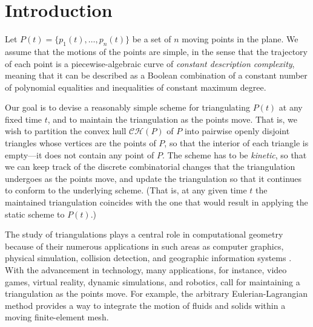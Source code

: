 \documentclass[11pt]{article}
\def\CH{{\mathcal{CH}}}
\begin{document}
\section{Introduction}\label{Sec:intro}

Let $P(t)=\{p_1(t),\ldots,p_n(t)\}$ be a set of $n$ moving points 
in the plane. We assume that the motions of the points are simple, in
the sense that the trajectory of each point is a piecewise-algebraic
curve of {\em constant description complexity}, meaning that it can be
described as a Boolean combination of a constant number of polynomial
equalities and inequalities of constant maximum degree.

Our goal is to devise a reasonably simple scheme for triangulating 
$P(t)$ at any fixed time $t$, and to maintain the triangulation 
as the points move. That is, we wish to partition the 
convex hull $\CH(P)$ of $P$ into pairwise openly disjoint 
triangles whose vertices are the points of $P$, so that the 
interior of each triangle is empty---it does not contain any 
point of $P$. The scheme has to be {\em kinetic}, so that we 
can keep track of the discrete combinatorial changes that the 
triangulation undergoes as the points move, and update the
triangulation so that it continues to conform to the underlying
scheme. (That is, at any given time $t$ the maintained triangulation coincides with the one that would result in applying the static scheme to $P(t)$.)


The study of triangulations plays a central role in computational geometry because of
their numerous applications in such areas as computer graphics,
physical simulation, collision detection, and geographic information systems \cite{BernEpp, EdelsMeshes}. With the advancement in technology, many applications, for instance, video
games, virtual reality, dynamic simulations, and robotics, call for maintaining a triangulation as the
points move. For example, the arbitrary Eulerian-Lagrangian method \cite{Lagrangean} provides a way to integrate
the motion of 
fluids and solids within a moving finite-element mesh.
\end{document}
